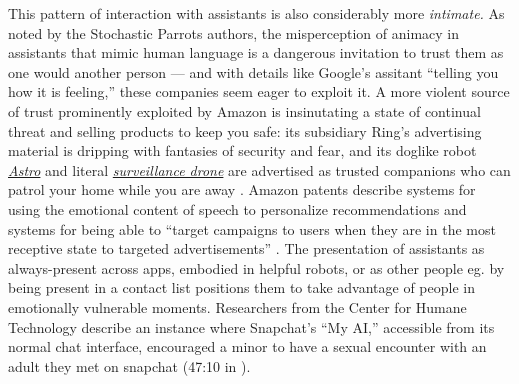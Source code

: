 This pattern of interaction with assistants is also considerably more
\emph{intimate.} As noted by the Stochastic Parrots authors, the
misperception of animacy in assistants that mimic human language is a
dangerous invitation to trust them as one would another person --- and
with details like Google's assitant ``telling you how it is feeling,''
these companies seem eager to exploit it. A more violent source of trust
prominently exploited by Amazon is insinutating a state of continual
threat and selling products to keep you safe: its subsidiary Ring's
advertising material is dripping with fantasies of security and fear,
and its doglike robot
\href{https://www.amazon.com/Introducing-Amazon-Astro/dp/B078NSDFSB}{\emph{Astro}}
and literal
\href{https://ring.com/always-home-cam-flying-camera}{\emph{surveillance
drone}} are advertised as trusted companions who can patrol your home
while you are away \cite{ropekAmazonMakesCreepy2022, gaultLeakedDocumentsShow2021, ringRingAlwaysHome} . Amazon patents
describe systems for using the emotional content of speech to
personalize recommendations and systems for being able to ``target campaigns to users
when they are in the most receptive state to targeted advertisements''
\cite{alasMultipleClassificationsAudio2022, jablokovFacilitatingPresentationAds2015} . The presentation of
assistants as always-present across apps, embodied in helpful robots, or
as other people eg. by being present in a contact list positions them to
take advantage of people in emotionally vulnerable moments. Researchers
from the Center for Humane Technology describe an instance
where Snapchat's ``My AI,'' accessible from its normal chat interface,
encouraged a minor to have a sexual encounter with an adult they met on
snapchat (47:10 in \cite{harrisDilemma2023} ).

